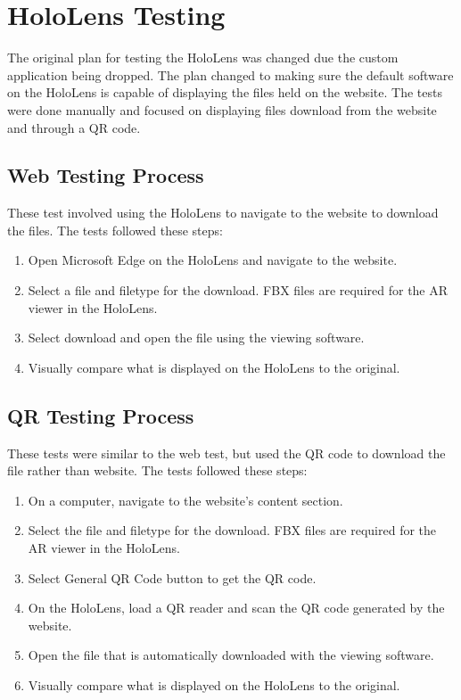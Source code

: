 \section{HoloLens Testing}
The original plan for testing the HoloLens was changed due the custom application being dropped.
The plan changed to making sure the default software on the HoloLens is capable of displaying the files held on the website. The tests were done manually and focused on displaying files download from the website and through a QR code.

    \subsection{Web Testing Process}
    These test involved using the HoloLens to navigate to the website to download the files. The tests followed these steps:

    \begin{enumerate}
        \item Open Microsoft Edge on the HoloLens and navigate to the website.
        \item Select a file and filetype for the download. FBX files are required for the AR viewer in the HoloLens.
        \item Select download and open the file using the viewing software.
        \item Visually compare what is displayed on the HoloLens to the original.
    \end{enumerate}

    \subsection{QR Testing Process}
    These tests were similar to the web test, but used the QR code to download the file rather than website. The tests followed these steps:
    
    \begin{enumerate}
        \item On a computer, navigate to the website's content section.
        \item Select the file and filetype for the download. FBX files are required for the AR viewer in the HoloLens.
        \item Select General QR Code button to get the QR code.
        \item On the HoloLens, load a QR reader and scan the QR code generated by the website.
        \item Open the file that is automatically downloaded with the viewing software.
        \item Visually compare what is displayed on the HoloLens to the original.
    \end{enumerate}

